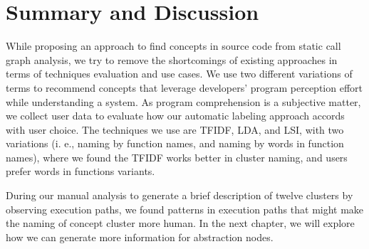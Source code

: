 \section{Summary and Discussion}
\label{conclusion}
While proposing an approach to find concepts in source code from static call graph analysis, we try to remove the shortcomings of existing approaches in terms of techniques evaluation and use cases. We use two different variations of terms to recommend concepts that leverage developers' program perception effort while understanding a system. As program comprehension is a subjective matter, we collect user data to evaluate how our automatic labeling approach accords with user choice. The techniques we use are TFIDF, LDA, and LSI, with two variations (i. e., naming by function names, and naming by words in function names), where we found the TFIDF works better in cluster naming, and users prefer words in functions variants.   

During our manual analysis to generate a brief description of twelve clusters by observing execution paths, we found patterns in execution paths that might make the naming of concept cluster more human. In the next chapter, we will explore how we can generate more information for abstraction nodes.
